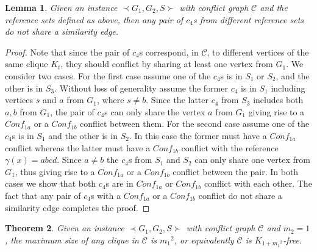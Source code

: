 \documentclass[final]{dmtcs-episciences}
\newtheorem{theorem}{Theorem}
\newtheorem{lemma}[theorem]{Lemma}
\begin{document}
\begin{lemma}
\label{lem_edgesharing}
Given an instance $\prec G_1,G_2,S \succ$ with conflict graph $\mathcal{C}$ and the reference sets defined as above, then any pair of $c_4$s from different reference sets do not share a similarity edge.
\end{lemma}
\begin{proof}
Note that since the pair of $c_4$s correspond, in $\mathcal{C}$, to different vertices of the same clique $K_t$, they should conflict
by sharing at least one vertex from $G_1$. 
We consider two cases. For the first case assume one of the $c_4$s is in $S_1$ or $S_2$, and the other is in $S_3$.
Without loss of generality assume the former $c_4$ is in $S_1$ including vertices $s$ and $a$ from $G_1$, where $s\neq b$.
Since the latter $c_4$ from $S_3$ includes both $a, b$ from $G_1$, the pair of $c_4$s can only share the vertex $a$ from 
$G_1$ giving rise to a $Conf_{1a}$ or a $Conf_{1b}$ conflict between them. 
For the second case assume one of the $c_4$s is in $S_1$ and 
the other is in $S_2$. In this case the former must have a $Conf_{1a}$ conflict whereas
the latter must have a $Conf_{1b}$ conflict with the reference $\gamma(x)=abcd$. Since $a\neq b$ 
the $c_4$s from $S_1$ and $S_2$ can only share one vertex from $G_1$, thus giving rise to a $Conf_{1a}$ or a $Conf_{1b}$ conflict between the pair. 
In both cases we show that both $c_4$s are in $Conf_{1a}$ or $Conf_{1b}$ conflict with each other. 
The fact that any pair of $c_4$s with a $Conf_{1a}$ or a $Conf_{1b}$ conflict do not share a similarity edge
completes the proof.
\end{proof}


 
\begin{theorem}
\label{lem_clique}
Given an instance $\prec G_1,G_2,S \succ$ with conflict graph $\mathcal{C}$ and $m_2=1$, the maximum size of any clique in $\mathcal{C}$ is 
${m_1}^2$, or equivalently $\mathcal{C}$ is $K_{1+{m_1}^2}$-free.
\end{theorem}
\end{document}
